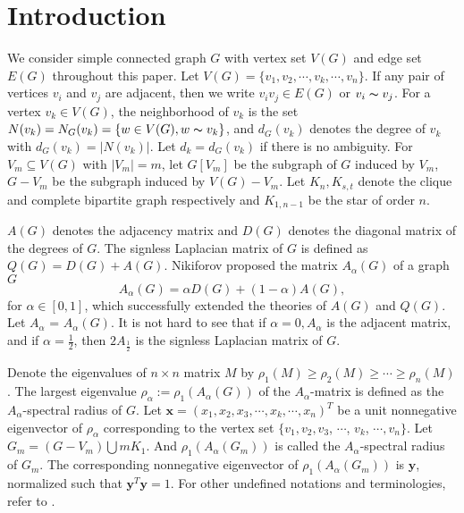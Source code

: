 \documentclass[amsthm]{elsart}
\begin{document}
\section{Introduction}

\qquad  We consider simple connected graph $G$ with vertex set $V(G)$ and edge set $E(G)$  throughout this paper.   Let $V(G)=\{v_1, v_2, \cdots, v_k, \cdots, v_n\}$. If any pair of vertices $v_i$ and $v_j$ are adjacent, then we write $v_iv_j \in E(G)$ or $v_i \thicksim v_j$. For a vertex $v_k \in V(G)$, the neighborhood of  $v_k $ is the set $N(v_k) = N_G(v_k) = \{w \in V(G), w  \thicksim  v_k   \}$, and $d_G(v_k)$  denotes the degree of $v_k$ with $ d_{G}(v_k) = |N(v_k)|$.  Let $d_k=d_G(v_k)$  if there
is no ambiguity. For $V_m \subseteq V(G)$ with $|V_m|=m$,   let $G[V_m]$ be the subgraph of $G$ induced by $V_m$, $G - V_m$ be the subgraph induced by $V(G) - V_m$. Let $K_n, K_{s,t}$   denote the clique and complete bipartite graph respectively and  $K_{1,n-1}$ be the star of order $n$.

\qquad  $A(G)$ denotes the adjacency matrix and $D(G)$ denotes the diagonal matrix of the degrees of $G$. The signless Laplacian matrix of $G$ is defined as $Q(G) = D(G)+ A(G).$ Nikiforov \cite{2016Merging} proposed the matrix  $A_{\alpha}(G)$  of a graph $G$ $$A_{\alpha}(G) = \alpha D(G) +(1-\alpha)A(G),$$ for $\alpha \in [0,1]$, which successfully extended the theories of $A(G)$ and $Q(G)$.  Let $A_\alpha$ = $A_\alpha(G)$. It is not hard to see that if $\alpha =0, A_{\alpha}$ is the adjacent matrix, and if $\alpha = \frac{1}{2}$, then $2A_{\frac{1}{2}}$ is the signless Laplacian matrix of $G$.

\par \qquad  Denote  the eigenvalues of $n \times n$ matrix $M$ by $\rho_1(M) \geqslant \rho_2(M) \geqslant \cdots \geqslant \rho_n(M)$. The largest eigenvalue $\rho_\alpha := \rho_1(A_{\alpha}(G))$ of the $A_\alpha$-matrix is defined as the $A_{\alpha}$-spectral radius of $G$.
 Let  $\textbf{x} = (x_1, x_2,x_3, \cdots,x_k, \cdots, x_n)^T$ be a unit nonnegative eigenvector of $\rho_\alpha$ corresponding to  the  vertex set $\{v_1, v_2,v_3$, $\cdots$, $v_k$, $\cdots, v_n\}$.
 Let $G_m =(G - V_m)  \bigcup m K_1$. And $\rho_1(A_\alpha(G_m))$ is called the $A_\alpha$-spectral radius of $G_m$.
The corresponding nonnegative eigenvector of $\rho_1(A_\alpha(G_m))$ is
$\textbf{y}$, normalized such that $\textbf{y}^{T} \textbf{y} = 1$.
For other undefined notations and terminologies, refer to \cite{2001Introduction}.
\end{document}
